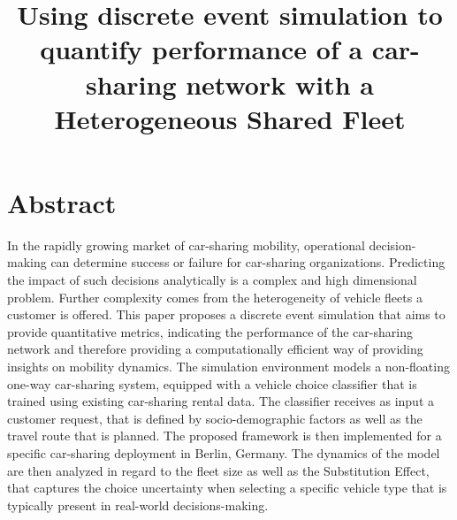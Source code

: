 \documentclass[a4paper, oneside, 12pt]{article}
\title{Using discrete event simulation to quantify performance of a car-sharing network with a Heterogeneous Shared Fleet}
\begin{document}




\clearpage
\thispagestyle{empty}
\section*{Abstract}

In the rapidly growing market of car-sharing mobility, operational decision-making
can determine success or failure for car-sharing organizations. Predicting the impact
of such decisions analytically is a complex and high dimensional problem. Further complexity
comes from the heterogeneity of vehicle fleets a customer is offered.
This paper proposes
a discrete event simulation that aims to provide quantitative metrics,
indicating the performance of the car-sharing network and therefore providing a computationally
efficient way of providing insights on mobility dynamics. The simulation environment models a non-floating
one-way car-sharing system, equipped with a vehicle choice classifier that
is trained using existing car-sharing rental data. The classifier receives as input
a customer request, that is defined by socio-demographic factors as well as the travel route that is planned.
The proposed framework is then implemented for a specific car-sharing deployment in Berlin, Germany.
The dynamics of the model
are then analyzed in regard to the fleet size as well as the Substitution Effect, that
captures the choice uncertainty when selecting a specific vehicle type
that is typically present in real-world
decisions-making. 



\clearpage
{}
\tableofcontents
\clearpage
\listoffigures
\clearpage
\listoftables
\clearpage



\end{document}
